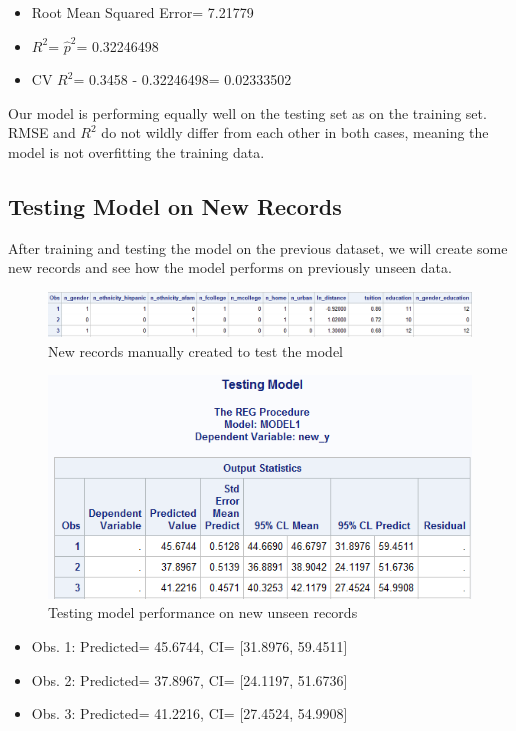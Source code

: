 \documentclass[12pt]{article}
\begin{document}
\newpage
\begin{itemize}
    \item Root Mean Squared Error= 7.21779
    \item $R^2$= $\hat{p}^2$= 0.32246498
    \item CV $R^2$= 0.3458 - 0.32246498= 0.02333502
\end{itemize}
Our model is performing equally well on the testing set as on the training set. RMSE and $R^2$ do not wildly differ from each other in both cases, meaning the model is not overfitting the training data.

\subsection{Testing Model on New Records}
After training and testing the model on the previous dataset, we will create some new records and see how the model performs on previously unseen data.
\begin{figure}[h]
    \centering
    \includegraphics[width=\textwidth]{tables/new_records.png}
    \caption{New records manually created to test the model}
    \label{fig:enter-label}
\end{figure}
\begin{figure}[h]
    \centering
    \includegraphics[width=\textwidth]{images/test_new.png}
    \caption{Testing model performance on new unseen records}
    \label{fig:enter-label}
\end{figure}
\newpage
\begin{itemize}
    \item Obs. 1: Predicted= 45.6744, CI= [31.8976, 59.4511]
    \item Obs. 2: Predicted= 37.8967, CI= [24.1197, 51.6736]
    \item Obs. 3: Predicted= 41.2216, CI= [27.4524, 54.9908]
\end{itemize}
\end{document}
